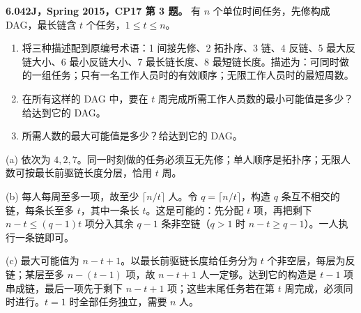 \begin{exercise}\label{mit:6042-cp17-q3}
\textbf{6.042J，Spring 2015，CP17 第 3 题。}
有 $n$ 个单位时间任务，先修构成 DAG，最长链含 $t$ 个任务，$1\le t\le n$。
\begin{enumerate}[label=(\alph*)]
\item 将三种描述配到原编号术语：1 间接先修、2 拓扑序、3 链、4 反链、5 最大反链大小、6 最小反链大小、7 最长链长度、8 最短链长度。描述为：可同时做的一组任务；只有一名工作人员时的有效顺序；无限工作人员时的最短周数。
\item 在所有这样的 DAG 中，要在 $t$ 周完成所需工作人员数的最小可能值是多少？给达到它的 DAG。
\item 所需人数的最大可能值是多少？给达到它的 DAG。
\end{enumerate}
\end{exercise}
\begin{solution}
(a) 依次为 $4,2,7$。同一时刻做的任务必须互无先修；单人顺序是拓扑序；无限人数可按最长前驱链长度分层，恰用 $t$ 周。

(b) 每人每周至多一项，故至少 $\lceil n/t\rceil$ 人。令 $q=\lceil n/t\rceil$，构造 $q$ 条互不相交的链，每条长至多 $t$，其中一条长 $t$。这是可能的：先分配 $t$ 项，再把剩下 $n-t\le(q-1)t$ 项分入其余 $q-1$ 条非空链（$q>1$ 时 $n-t\ge q-1$）。一人执行一条链即可。

(c) 最大可能值为 $n-t+1$。以最长前驱链长度给任务分为 $t$ 个非空层，每层为反链；某层至多 $n-(t-1)$ 项，故 $n-t+1$ 人一定够。达到它的构造是 $t-1$ 项串成链，最后一项先于剩下 $n-t+1$ 项；这些末尾任务若在第 $t$ 周完成，必须同时进行。$t=1$ 时全部任务独立，需要 $n$ 人。
\end{solution}

